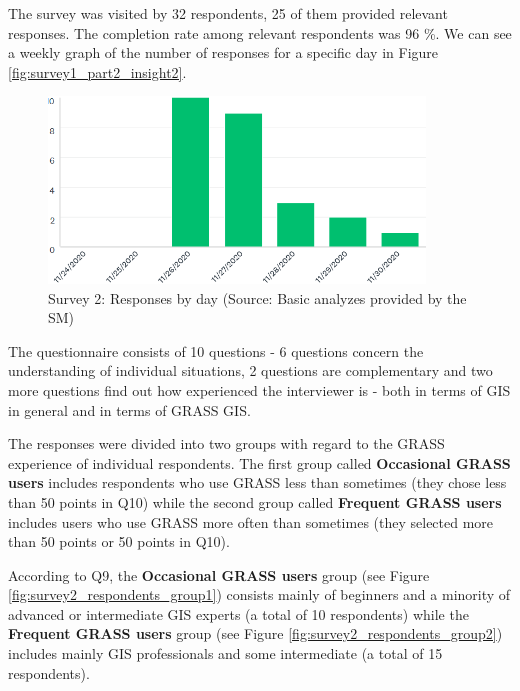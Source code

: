 \documentclass[a4paper,10pt,twoside]{article}
\begin{document}
\noindent The survey was visited by 32 respondents, 25 of them provided relevant responses. The completion rate among relevant respondents was 96 \%. We can see a weekly graph of the number of responses for a specific day in Figure \ref{fig:survey1_part2_insight2}.

\vspace{0.3cm}
\begin{figure}[hbt!] 
\begin{center}
\includegraphics[width=10cm]{../surveys/analyzed_data/survey2_insight2.png} 
\caption[Survey 2: Responses by day]{Survey 2: Responses by day (Source: Basic analyzes provided by the SM)}
\label{fig:survey2_insight2}
\end{center}
\end{figure}

\noindent The questionnaire consists of 10 questions - 6 questions concern the understanding of individual situations, 2 questions are complementary and two more questions find out how experienced the interviewer is - both in terms of GIS in general and in terms of GRASS GIS.

The responses were divided into two groups with regard to the GRASS experience of individual respondents. The first group called \textbf{Occasional GRASS users} includes respondents who use GRASS less than sometimes (they chose less than 50 points in Q10) while the second group called \textbf{Frequent GRASS users} includes users who use GRASS more often than sometimes (they selected more than 50 points or 50 points in Q10).

According to Q9, the \textbf{Occasional GRASS users} group (see Figure \ref{fig:survey2_respondents_group1}) consists mainly of beginners and a minority of advanced or intermediate GIS experts (a total of 10 respondents) while the \textbf{Frequent GRASS users} group (see Figure \ref{fig:survey2_respondents_group2}) includes mainly GIS professionals and some intermediate (a total of 15 respondents).
\end{document}
